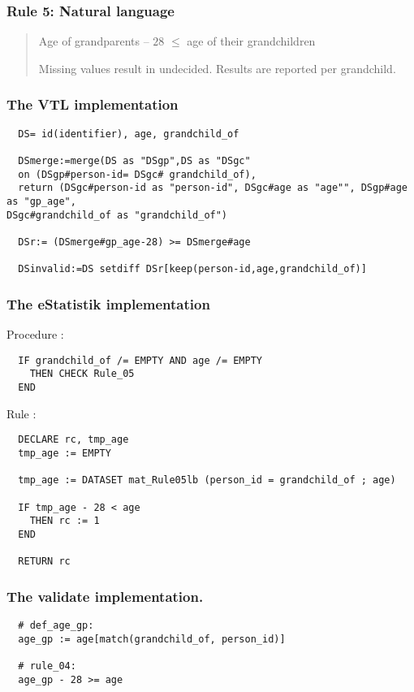 \newpage

\subsubsection*{  Rule 5: Natural language}
\begin{quote}


Age of grandparents $–$ $28$ $\leq$ age of their grandchildren

Missing values result in undecided. Results are reported per grandchild.



\end{quote}
\subsubsection*{The VTL implementation}
\begin{verbatim}
  DS= id(identifier), age, grandchild_of

  DSmerge:=merge(DS as "DSgp",DS as "DSgc"
  on (DSgp#person-id= DSgc# grandchild_of),
  return (DSgc#person-id as "person-id", DSgc#age as "age"", DSgp#age as "gp_age",
DSgc#grandchild_of as "grandchild_of")

  DSr:= (DSmerge#gp_age-28) >= DSmerge#age

  DSinvalid:=DS setdiff DSr[keep(person-id,age,grandchild_of)]

\end{verbatim}
\subsubsection*{The eStatistik implementation}
\noindent
Procedure :
\begin{verbatim}
  IF grandchild_of /= EMPTY AND age /= EMPTY
    THEN CHECK Rule_05
  END
\end{verbatim}
\noindent
Rule :
\begin{verbatim}
  DECLARE rc, tmp_age
  tmp_age := EMPTY

  tmp_age := DATASET mat_Rule05lb (person_id = grandchild_of ; age)

  IF tmp_age - 28 < age
    THEN rc := 1
  END

  RETURN rc
\end{verbatim}

\subsubsection*{The validate implementation.}
\begin{verbatim}
  # def_age_gp:
  age_gp := age[match(grandchild_of, person_id)]

  # rule_04:
  age_gp - 28 >= age
\end{verbatim}


